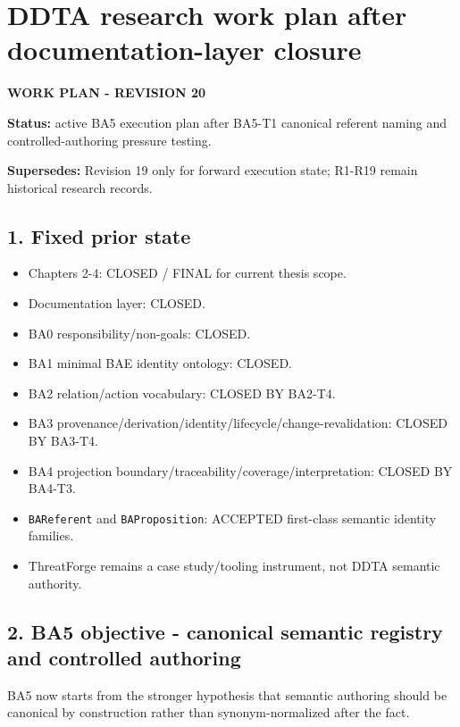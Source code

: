 \documentclass[
  10pt,
  a4paper,
]{article}
\author{}
\date{}
\providecommand{\tightlist}{%
  \setlength{\itemsep}{0pt}\setlength{\parskip}{0pt}}
\begin{document}
\section{DDTA research work plan after documentation-layer
closure}\label{ddta-research-work-plan-after-documentation-layer-closure}

\textbf{WORK PLAN - REVISION 20}

\textbf{Status:} active BA5 execution plan after BA5-T1 canonical
referent naming and controlled-authoring pressure testing.

\textbf{Supersedes:} Revision 19 only for forward execution state;
R1-R19 remain historical research records.

\subsection{1. Fixed prior state}\label{fixed-prior-state}

\begin{itemize}
\tightlist
\item
  Chapters 2-4: CLOSED / FINAL for current thesis scope.
\item
  Documentation layer: CLOSED.
\item
  BA0 responsibility/non-goals: CLOSED.
\item
  BA1 minimal BAE identity ontology: CLOSED.
\item
  BA2 relation/action vocabulary: CLOSED BY BA2-T4.
\item
  BA3 provenance/derivation/identity/lifecycle/change-revalidation:
  CLOSED BY BA3-T4.
\item
  BA4 projection boundary/traceability/coverage/interpretation: CLOSED
  BY BA4-T3.
\item
  \texttt{BAReferent} and \texttt{BAProposition}: ACCEPTED first-class
  semantic identity families.
\item
  ThreatForge remains a case study/tooling instrument, not DDTA semantic
  authority.
\end{itemize}

\subsection{2. BA5 objective - canonical semantic registry and
controlled
authoring}\label{ba5-objective---canonical-semantic-registry-and-controlled-authoring}

BA5 now starts from the stronger hypothesis that semantic authoring
should be canonical by construction rather than synonym-normalized after
the fact.
\end{document}
